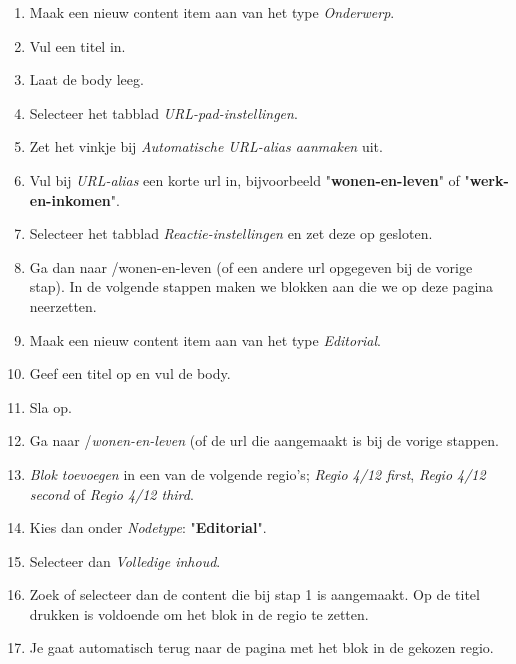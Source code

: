 \begin{enumerate}
\item Maak een nieuw content item aan van het type \emph{Onderwerp}.
\item Vul een titel in.
\item Laat de body leeg.
\item Selecteer het tabblad \emph{URL-pad-instellingen}.
\item Zet het vinkje bij \emph{Automatische URL-alias aanmaken} uit.
\item Vul bij \emph{URL-alias} een korte url in, bijvoorbeeld "\textbf{wonen-en-leven}" of "\textbf{werk-en-inkomen}".
\item Selecteer het tabblad \emph{Reactie-instellingen} en zet deze op gesloten.
\item Ga dan naar /wonen-en-leven (of een andere url opgegeven bij de vorige stap). In de volgende stappen maken we blokken aan die we op deze pagina neerzetten.
\item Maak een nieuw content item aan van het type \emph{Editorial}.
\item Geef een titel op en vul de body.
\item Sla op.
\item Ga naar /\emph{wonen-en-leven} (of de url die aangemaakt is bij de vorige stappen.
\item \emph{Blok toevoegen} in een van de volgende regio's; \emph{Regio 4/12 first}, \emph{Regio 4/12 second} of \emph{Regio 4/12 third}.
\item Kies dan onder \emph{Nodetype}: "\textbf{Editorial}".
\begin{center}
\end{center}
\item Selecteer dan \emph{Volledige inhoud}.
\item Zoek of selecteer dan de content die bij stap 1 is aangemaakt. Op de titel drukken is voldoende om het blok in de regio te zetten.
\item Je gaat automatisch terug naar de pagina met het blok in de gekozen regio.
\end{enumerate}

